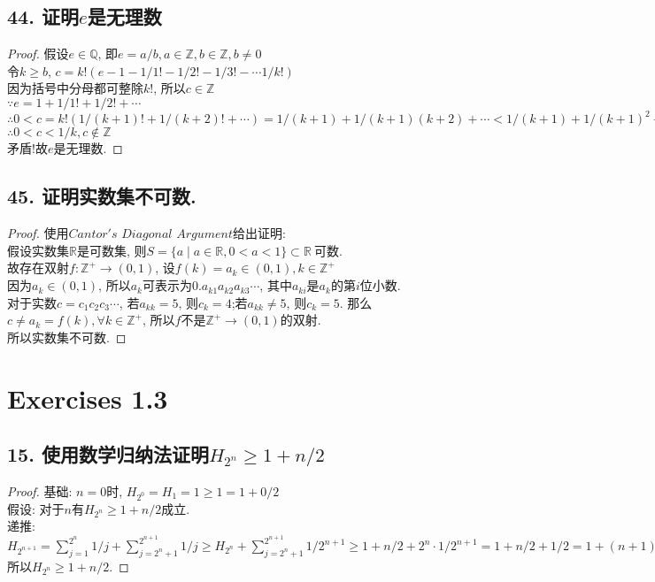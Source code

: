 \documentclass[UTF8, onecolumn, a4paper]{article}
\begin{document}
\subsection*{44. 证明$e$是无理数}
\begin{proof}
假设$e\in \mathbb{Q}$, 即$e = a / b, a\in \mathbb{Z},b\in \mathbb{Z}, b\neq0$\\
令$k \geq b$, $c = k!(e - 1 - 1/1! - 1/2! - 1/3! - \cdots 1/k!)$\\
因为括号中分母都可整除$k!$, 所以$c\in \mathbb{Z}$\\
$\because e = 1 + 1/1! + 1/2! + \cdots$\\
$\therefore 0 < c = k!(1/(k+1)! + 1/(k+2)! + \cdots) = 1/(k+1) + 1/(k+1)(k+2) + \cdots < 1/(k+1) + 1/(k+1)^2 + \cdots = 1/k $\\
$\therefore 0 < c < 1/k, c \notin \mathbb{Z}$\\
矛盾!故$e$是无理数.
\end{proof}
\subsection*{45. 证明实数集不可数.}
\begin{proof}
使用$Cantor's$ $Diagonal$ $Argument$给出证明:\\
假设实数集$\mathbb{R}$是可数集, 则$S = \{a \mid a\in \mathbb{R}, 0 < a < 1\}\subset \mathbb{R}\ $可数.\\
故存在双射$f: \mathbb{Z^+}\rightarrow (0,1)$, 设$f(k) = a_k\in(0,1), k\in \mathbb{Z^+}$\\
因为$a_k\in(0, 1)$, 所以$a_k$可表示为$0. a_{k1} a_{k2} a_{k3}\cdots$, 其中$a_{ki}$是$a_k$的第$i$位小数.\\
对于实数$c = c_1c_2c_3\cdots$, 若$a_{kk} = 5$, 则$c_k = 4$;若$a_{kk} \neq 5$, 则$c_k = 5$. 那么$c\neq a_k = f(k), \forall k\in \mathbb{Z^+}$, 所以$f$不是$\mathbb{Z^+}\rightarrow (0,1)$的双射.\\
所以实数集不可数. 
\end{proof}
\section*{Exercises 1.3}
\subsection*{15. 使用数学归纳法证明$H_{2^n} \geq 1 + n/2$}
\begin{proof}
基础: $n= 0$时, $H_{2^0} = H_1 = 1 \geq 1 = 1 + 0/2$\\
假设: 对于$n$有$H_{2^n} \geq 1 + n/2$成立.\\
递推: $H_{2^{n+1}} = \sum_{j=1}^{2^n}1/j + \sum_{j=2^n+1}^{2^{n+1}}1/j \geq H_{2^n} + \sum_{j=2^n+1}^{2^{n+1}}1/2^{n+1}\geq 1 + n/2 + 2^n\cdot 1/2^{n+1} = 1 + n/2 + 1/2 = 1 + (n+1)/2.$\\
所以$H_{2^n} \geq 1 + n/2$.
\end{proof}
\end{document}
